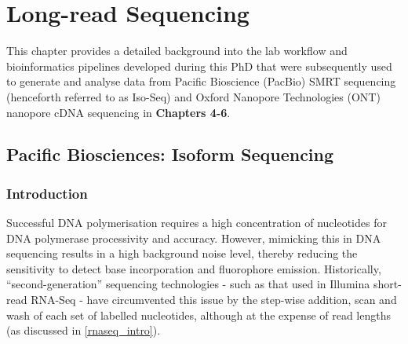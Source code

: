 \cleardoublepage
\chapter{Long-read Sequencing}\label{ch: long_read_sequencing}

This chapter provides a detailed background into the lab workflow and bioinformatics pipelines developed during this PhD that were subsequently used to generate and analyse data from Pacific Bioscience (PacBio) SMRT sequencing (henceforth referred to as Iso-Seq) and Oxford Nanopore Technologies (ONT) nanopore cDNA sequencing in \textbf{Chapters 4-6}. 

\section{Pacific Biosciences: Isoform Sequencing}
\label{sec:pb_isoform_sequencing}

\subsection{Introduction}
Successful DNA polymerisation requires a high concentration of nucleotides for DNA polymerase processivity and accuracy. However, mimicking this in DNA sequencing results in a high background noise level, thereby reducing the sensitivity to detect base incorporation and fluorophore emission. Historically, “second-generation” sequencing technologies - such as that used in Illumina short-read RNA-Seq - have circumvented this issue by the step-wise addition, scan and wash of each set of labelled nucleotides, although at the expense of read lengths (as discussed in \cref{rnaseq_intro}). 

